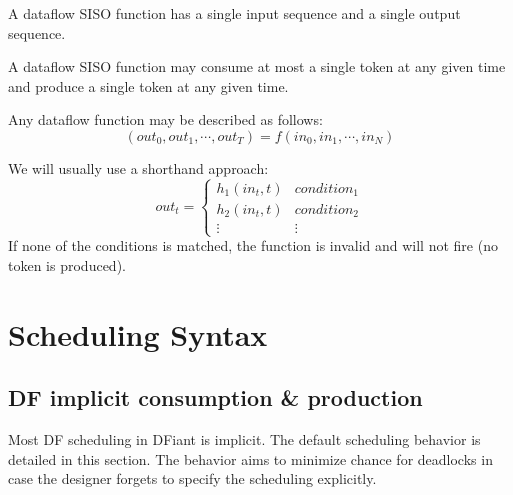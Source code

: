 \begin{definition}
	A dataflow SISO function has a single input sequence and a single output sequence.
	\begin{corollary}
		A dataflow SISO function may consume at most a single token at any given time and produce a single token at any given time.
	\end{corollary}

	\begin{notation}
		Any dataflow function may be described as follows:
		\begin{equation*}
			\left( out_0,out_1,\cdots,out_T \right)=f\left( in_0,in_1,\cdots,in_N \right)
		\end{equation*}
	\end{notation}

	\begin{notation}
		We will usually use a shorthand approach:
		\begin{equation*}
			out_t = \begin{cases}
				h_1(in_{t}, t) & condition_1 \\
				h_2(in_{t}, t) & condition_2 \\
				\vdots & \vdots
			\end{cases}
		\end{equation*}
		If none of the conditions is matched, the function is invalid and will not fire (no token is produced).
	\end{notation}
	
\end{definition}




\chapter{Scheduling Syntax}
\section{DF implicit consumption \& production}
Most DF scheduling in DFiant is implicit. The default scheduling behavior is detailed in this section. The behavior aims to minimize chance for deadlocks in case the designer forgets to specify the scheduling explicitly.

